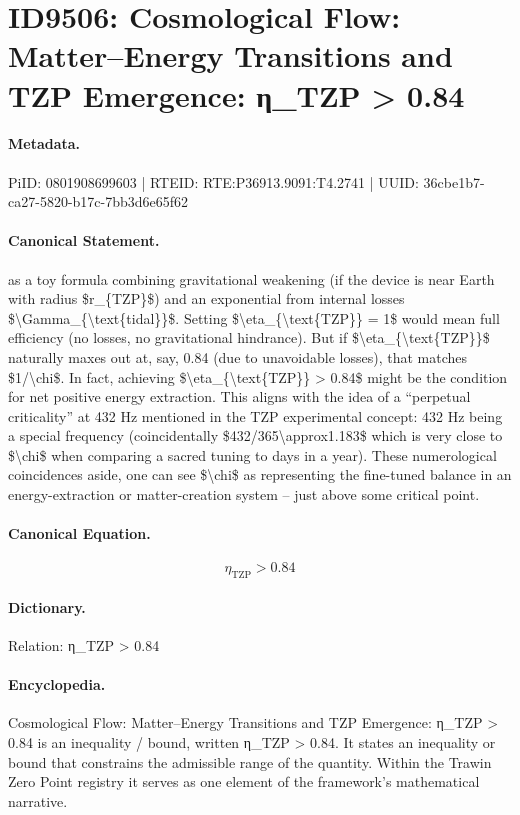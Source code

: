 \section*{ID9506: Cosmological Flow: Matter–Energy Transitions and TZP Emergence: η\_TZP > 0.84}
\paragraph{Metadata.}
PiID: 0801908699603 | RTEID: RTE:P36913.9091:T4.2741 | UUID: 36cbe1b7-ca27-5820-b17c-7bb3d6e65f62

\paragraph{Canonical Statement.}
as a toy formula combining gravitational weakening (if the device is near Earth with radius \$r\_\{TZP\}\$) and an exponential from internal losses \$\textbackslash{}Gamma\_\{\textbackslash{}text\{tidal\}\}\$. Setting \$\textbackslash{}eta\_\{\textbackslash{}text\{TZP\}\} = 1\$ would mean full efficiency (no losses, no gravitational hindrance). But if \$\textbackslash{}eta\_\{\textbackslash{}text\{TZP\}\}\$ naturally maxes out at, say, 0.84 (due to unavoidable losses), that matches \$1/\textbackslash{}chi\$. In fact, achieving \$\textbackslash{}eta\_\{\textbackslash{}text\{TZP\}\} > 0.84\$ might be the condition for net positive energy extraction. This aligns with the idea of a “perpetual criticality” at 432 Hz mentioned in the TZP experimental concept: 432 Hz being a special frequency (coincidentally \$432/365\textbackslash{}approx1.183\$ which is very close to \$\textbackslash{}chi\$ when comparing a sacred tuning to days in a year). These numerological coincidences aside, one can see \$\textbackslash{}chi\$ as representing the fine-tuned balance in an energy-extraction or matter-creation system – just above some critical point.

\paragraph{Canonical Equation.}
\[
\eta_{\text{TZP}} > 0.84
\]

\paragraph{Dictionary.}
Relation: η\_TZP > 0.84

\paragraph{Encyclopedia.}
Cosmological Flow: Matter–Energy Transitions and TZP Emergence: η\_TZP > 0.84 is an inequality / bound, written η\_TZP > 0.84. It states an inequality or bound that constrains the admissible range of the quantity. Within the Trawin Zero Point registry it serves as one element of the framework's mathematical narrative.
